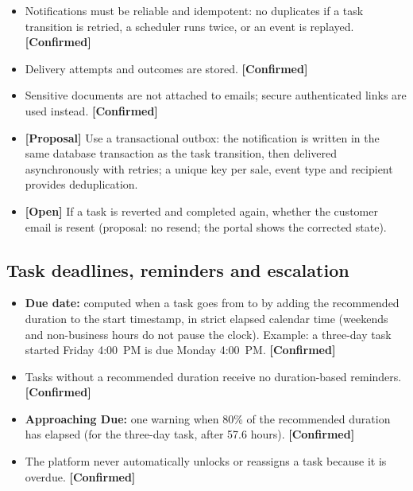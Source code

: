 \documentclass[11pt,a4paper]{article}
\newcommand{\code}[1]{\texttt{\detokenize{#1}}}
\newcommand{\tagconf}{\textcolor{green!45!black}{\textbf{[Confirmed]}}}
\newcommand{\tagprop}{\textcolor{orange!80!black}{\textbf{[Proposal]}}}
\newcommand{\tagopen}{\textcolor{red!70!black}{\textbf{[Open]}}}
\begin{document}
\begin{itemize}
	\item Notifications must be reliable and idempotent: no duplicates if a task
	      transition is retried, a scheduler runs twice, or an event is replayed.
	      \tagconf{}
	\item Delivery attempts and outcomes are stored. \tagconf{}
	\item Sensitive documents are not attached to emails; secure authenticated
	      links are used instead. \tagconf{}
	\item \tagprop{} Use a transactional outbox: the notification is written in
	      the same database transaction as the task transition, then delivered
	      asynchronously with retries; a unique key per sale, event type and
	      recipient
	      provides deduplication.
	\item \tagopen{} If a task is reverted and completed again, whether the
	      customer email is resent (proposal: no resend; the portal shows the
	      corrected
	      state).
\end{itemize}

\subsection{Task deadlines, reminders and escalation}\label{sec:sla}

\begin{itemize}
	\item \textbf{Due date:} computed when a task goes from \code{pending} to
	      \code{in_progress} by adding the recommended duration to the start
	      timestamp, in
	      strict elapsed calendar time (weekends and non-business hours do not
	      pause the
	      clock). Example: a three-day task started Friday 4:00~PM is due Monday
	      4:00~PM.
	      \tagconf{}
	\item Tasks without a recommended duration receive no duration-based
	      reminders. \tagconf{}
	\item \textbf{Approaching Due:} one warning when 80\% of the recommended
	      duration has elapsed (for the three-day task, after 57.6 hours).
	      \tagconf{}
	\item The platform never automatically unlocks or reassigns a task because it
	      is overdue. \tagconf{}
\end{itemize}
\end{document}
